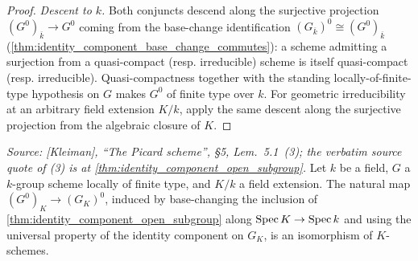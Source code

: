 \begin{proof}
  \emph{Descent to \(k\).}  Both conjuncts descend along the surjective
  projection \((G^0)_{\overline k} \to G^0\) coming from the base-change
  identification \((G_{\overline k})^0 \cong (G^0)_{\overline k}\)
  (\cref{thm:identity_component_base_change_commutes}): a scheme admitting a
  surjection from a quasi-compact (resp. irreducible) scheme is itself
  quasi-compact (resp. irreducible). Quasi-compactness together with the
  standing locally-of-finite-type hypothesis on \(G\) makes \(G^0\) of
  finite type over \(k\). For geometric irreducibility at an arbitrary field
  extension \(K/k\), apply the same descent along the surjective projection
  from the algebraic closure of \(K\).
\end{proof}

\begin{theorem}\leanok
  \label{thm:identity_component_base_change_commutes}

  \textit{Source: [Kleiman], ``The Picard scheme'', \S 5,
  Lem.~5.1~(3); the verbatim source quote of (3) is at
  \cref{thm:identity_component_open_subgroup}.}
  Let \(k\) be a field, \(G\) a \(k\)-group scheme locally of finite
  type, and \(K/k\) a field extension. The natural map
  \((G^0)_K \to (G_K)^0\), induced by base-changing the inclusion of
  \cref{thm:identity_component_open_subgroup} along \(\operatorname{Spec} K \to \operatorname{Spec} k\)
  and using the universal property of the identity component on
  \(G_K\), is an isomorphism of \(K\)-schemes.
\end{theorem}

